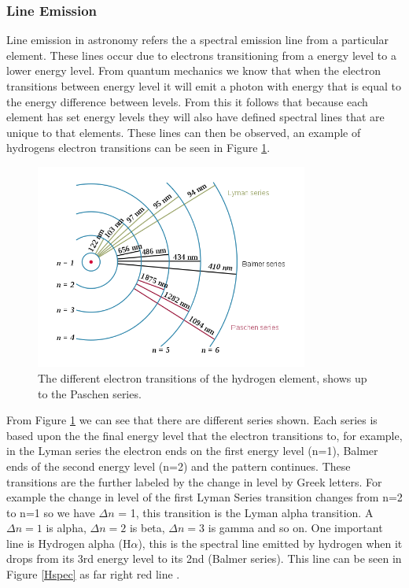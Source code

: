 \documentclass[10pt,a4paper]{article}
\begin{document}
\subsubsection*{Line Emission}
Line emission in astronomy refers the a spectral emission line from a particular element. These lines occur due to electrons transitioning from a energy level to a lower energy level. From quantum mechanics we know that when the electron transitions between energy level it will emit a photon with energy that is equal to the energy difference between levels. From this it follows that because each element has set energy levels they will also have defined spectral lines that are unique to that elements. These lines can then be observed, an example of hydrogens electron transitions can be seen in Figure \ref{Hline}.
\begin{figure}[H]
\begin{center}
	\includegraphics[width=0.8\textwidth]{Hline}
	\caption{The different electron transitions of the hydrogen element, shows up to the Paschen series\footnotemark.}
	\label{Hline}
\end{center}
\end{figure}
From Figure \ref{Hline} we can see that there are different series shown. Each series is based upon the the final energy level that the electron transitions to, for example, in the Lyman series the electron ends on the first energy level (n=1), Balmer ends of the second energy level (n=2) and the pattern continues. These transitions are the further labeled by the change in level by Greek letters. For example the change in level of the first Lyman Series transition changes from n=2 to n=1 so we have $\Delta n$ = 1, this transition is the Lyman alpha transition. A $\Delta n = 1$ is alpha,  $\Delta n = 2$ is beta,  $\Delta n = 3$ is gamma and so on. One important line is Hydrogen alpha (H$\alpha$), this is the spectral line emitted by hydrogen when it drops from its 3rd energy level to its 2nd (Balmer series). This line can be seen in Figure \ref{Hspec} as far right red line .
\end{document}
